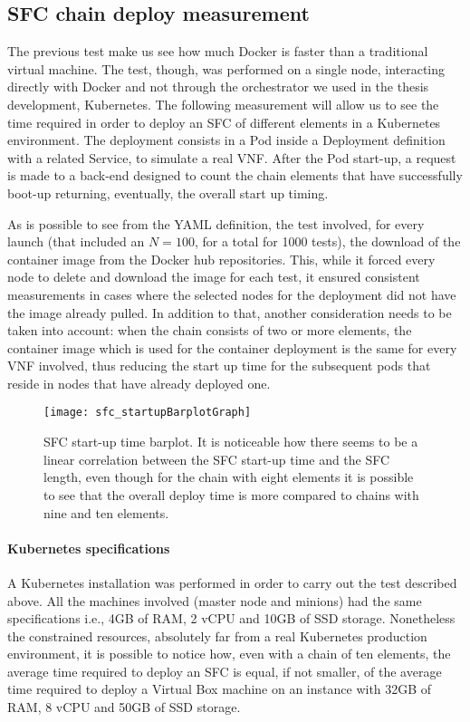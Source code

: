 \subsection{SFC chain deploy measurement}

The previous test make us see how much Docker is faster than a traditional
virtual machine. The test, though, was performed on a single node, interacting
directly with Docker and not through the orchestrator we used in the thesis
development, Kubernetes. The following measurement will allow us to see the time
required in order to deploy an SFC of different elements in a Kubernetes
environment. The deployment consists in a Pod inside a Deployment definition
with a related Service, to simulate a real VNF. After the Pod start-up, a
request is made to a back-end designed to count the chain elements that have
successfully boot-up returning, eventually, the overall start up timing.

\noindent As is possible to see from the YAML definition, the test involved, for
every launch (that included an $N = 100$, for a total for 1000 tests), the
download of the container image from the Docker hub repositories. This, while it
forced every node to delete and download the image for each test, it ensured
consistent measurements in cases where the selected nodes for the deployment did
not have the image already pulled. In addition to that, another consideration
needs to be taken into account: when the chain consists of two or more elements,
the container image which is used for the container deployment is the same for
every VNF involved, thus reducing the start up time for the subsequent pods that
reside in nodes that have already deployed one.

\begin{figure}[t]
  \centering
  \texttt{[image: sfc\_startupBarplotGraph]}
  \caption[SFC start-up time barplot]{SFC start-up time barplot. It is
    noticeable how there seems to be a linear correlation between the SFC
    start-up time and the SFC length, even though for the chain with eight
    elements it is possible to see that the overall deploy time is more compared
    to chains with nine and ten elements.}
  \label{chap:tests:sec:sfclength:img:barplot}
\end{figure}

\paragraph*{Kubernetes specifications}
A Kubernetes installation was performed in order to carry out the test
described above. All the machines involved (master node and minions) had the
same specifications i.e., 4GB of RAM, 2 vCPU and 10GB of SSD storage.
Nonetheless the constrained resources, absolutely far from a real Kubernetes
production environment, it is possible to notice how, even with a chain of ten
elements, the average time required to deploy an SFC is equal, if not smaller,
of the average time required to deploy a Virtual Box machine on an instance 
with 32GB of RAM, 8 vCPU and 50GB of SSD storage.

